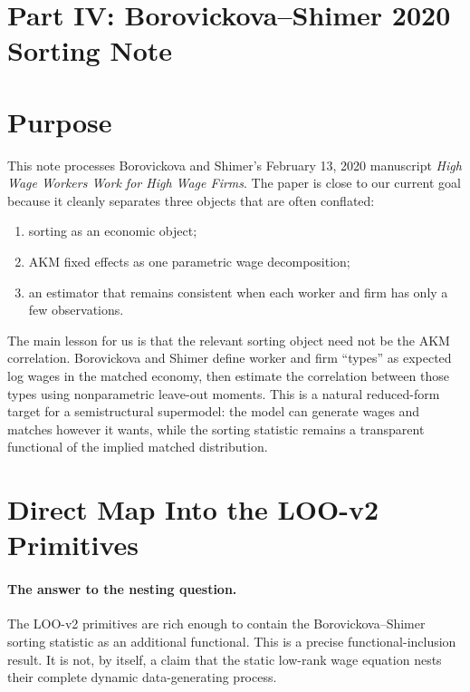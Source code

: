 \documentclass[11pt]{article}
\begin{document}
\clearpage
\section*{Part IV: Borovickova--Shimer 2020 Sorting Note}

\section*{Purpose}

This note processes Borovickova and Shimer's February 13, 2020 manuscript \emph{High Wage Workers Work for High Wage Firms}. The paper is close to our current goal because it cleanly separates three objects that are often conflated:
\begin{enumerate}[leftmargin=*]
  \item sorting as an economic object;
  \item AKM fixed effects as one parametric wage decomposition;
  \item an estimator that remains consistent when each worker and firm has only a few observations.
\end{enumerate}

The main lesson for us is that the relevant sorting object need not be the AKM correlation. Borovickova and Shimer define worker and firm ``types'' as expected log wages in the matched economy, then estimate the correlation between those types using nonparametric leave-out moments. This is a natural reduced-form target for a semistructural supermodel: the model can generate wages and matches however it wants, while the sorting statistic remains a transparent functional of the implied matched distribution.

\section*{Direct Map Into the LOO-v2 Primitives}

\paragraph{The answer to the nesting question.}
The LOO-v2 primitives are rich enough to contain the
Borovickova--Shimer sorting statistic as an additional functional.  This is a
precise functional-inclusion result.  It is not, by itself, a claim that the
static low-rank wage equation nests their complete dynamic data-generating
process.
\end{document}
